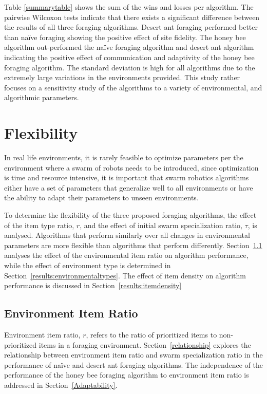 Table \ref{summarytable} shows the sum of the wins and losses per algorithm. The pairwise Wilcoxon tests indicate that there exists a significant difference between the results of all three foraging algorithms. Desert ant foraging performed better than na\"ive foraging showing the positive effect of site fidelity. The honey bee algorithm out-performed the na\"ive foraging algorithm and desert ant algorithm indicating the positive effect of communication and adaptivity of the honey bee foraging algorithm. The standard deviation is high for all algorithms due to the extremely large variations in the environments provided. This study rather focuses on a sensitivity study of the algorithms to a variety of environmental, and algorithmic parameters.


\section{Flexibility}
\label{results:flexibility}

In real life environments, it is rarely feasible to optimize parameters per the environment where a swarm of robots needs to be introduced, since optimization is time and resource intensive, it is important that swarm robotics algorithms either have a set of parameters that generalize well to all environments or have the ability to adapt their parameters to unseen environments.

To determine the flexibility of the three proposed foraging algorithms, the effect of the item type ratio, $r$, and the effect of initial swarm specialization ratio, $\tau$, is analysed. Algorithms that perform similarly over all changes in environmental parameters are more flexible than algorithms that perform differently. Section~\ref{results:ratio} analyses the effect of the environmental item ratio on algorithm performance, while the effect of environment type is determined in Section~\ref{results:environmentaltypes}. The effect of item density on algorithm performance is discussed in Section~\ref{results:itemdensity}

\subsection{Environment Item Ratio}
\label{results:ratio}

Environment item ratio, $r$, refers to the ratio of prioritized items to non-prioritized items in a foraging environment. 
Section~\ref{relationship} explores the relationship between environment item ratio and swarm specialization ratio in the performance of na\"ive and desert ant foraging algorithms. The independence of the performance of the honey bee foraging algorithm to environment item ratio is addressed in Section~\ref{Adaptability}.


